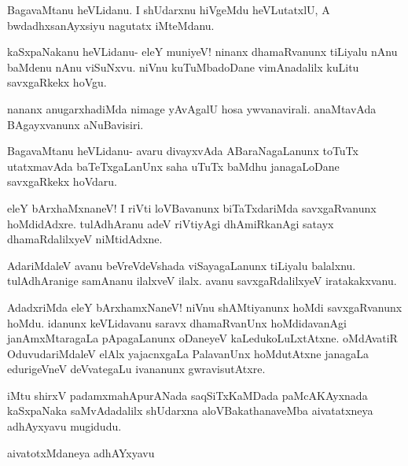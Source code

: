 \documentclass{article}
\begin{document}
\begin{mng}%
BagavaMtanu heVLidanu. I shUdarxnu hiVgeMdu heVLutatxlU,
A bwdadhxsanAyxsiyu nagutatx iMteMdanu.
\end{mng}

\begin{mng}%
kaSxpaNakanu heVLidanu- eleY muniyeV! ninanx dhamaRvanunx
tiLiyalu nAnu baMdenu nAnu viSuNxvu. niVnu kuTuMbadoDane vimAnadalilx
kuLitu savxgaRkekx hoVgu.
\end{mng}

\begin{mng}%
nananx anugarxhadiMda nimage yAvAgalU hosa ywvanavirali.
anaMtavAda BAgayxvanunx aNuBavisiri.
\end{mng}

\begin{mng}%
BagavaMtanu heVLidanu- avaru divayxvAda ABaraNagaLanunx
toTuTx utatxmavAda baTeTxgaLanUnx saha uTuTx baMdhu janagaLoDane savxgaRkekx
hoVdaru.
\end{mng}

\begin{mng}%
eleY bArxhaMxnaneV! I riVti loVBavanunx biTaTxdariMda savxgaRvanunx
hoMdidAdxre. tulAdhAranu adeV riVtiyAgi dhAmiRkanAgi satayx
dhamaRdalilxyeV niMtidAdxne.
\end{mng}

\begin{mng}%
AdariMdaleV avanu beVreVdeVshada viSayagaLanunx tiLiyalu
balalxnu. tulAdhAranige samAnanu ilalxveV ilalx. avanu savxgaRdalilxyeV
iratakakxvanu.
\end{mng}

\begin{mng}%
AdadxriMda eleY bArxhamxNaneV! niVnu shAMtiyanunx hoMdi
savxgaRvanunx hoMdu. idanunx keVLidavanu saravx dhamaRvanUnx hoMdidavanAgi
janAmxMtaragaLa pApagaLanunx oDaneyeV kaLedukoLuLxtAtxne. oMdAvatiR
OduvudariMdaleV elAlx yajacnxgaLa PalavanUnx hoMdutAtxne janagaLa edurigeVneV
deVvategaLu ivananunx gwravisutAtxre.
\end{mng}

\begin{center}
iMtu shirxV padamxmahApurANada saqSiTxKaMDada paMcAKAyxnada
kaSxpaNaka saMvAdadalilx shUdarxna aloVBakathanaveMba
aivatatxneya adhAyxyavu mugidudu.
\end{center}

\newpage
\begin{center}
{\textbf\large{aivatotxMdaneya adhAYxyavu}}
\end{center}
\end{document}
